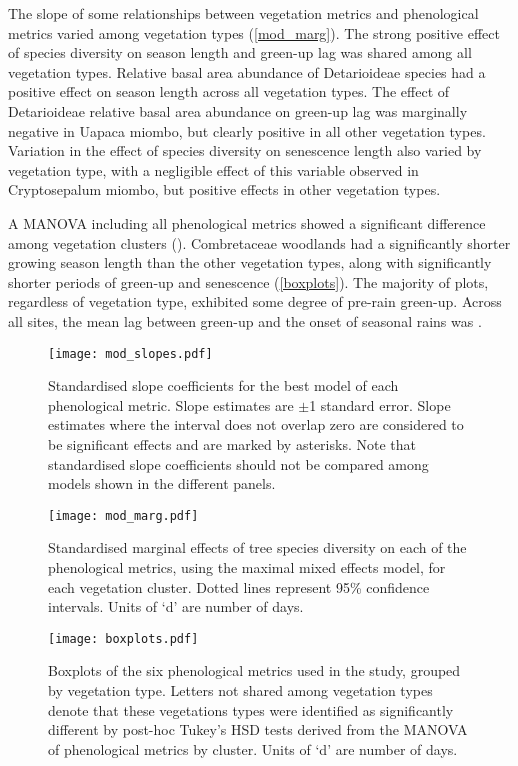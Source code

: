 \documentclass[11pt,a4paper]{article}
\begin{document}
The slope of some relationships between vegetation metrics and phenological metrics varied among vegetation types (\autoref{mod_marg}). The strong positive effect of species diversity on season length and green-up lag was shared among all vegetation types. Relative basal area abundance of Detarioideae species had a positive effect on season length across all vegetation types. The effect of Detarioideae relative basal area abundance on green-up lag was marginally negative in Uapaca miombo, but clearly positive in all other vegetation types. Variation in the effect of species diversity on senescence length also varied by vegetation type, with a negligible effect of this variable observed in Cryptosepalum miombo, but positive effects in other vegetation types.
 
A MANOVA including all phenological metrics showed a significant difference among vegetation clusters (\phenManova{}). Combretaceae woodlands had a significantly shorter growing season length than the other vegetation types, along with significantly shorter periods of green-up and senescence (\autoref{boxplots}). The majority of plots, regardless of vegetation type, exhibited some degree of pre-rain green-up. Across all sites, the mean lag between green-up and the onset of seasonal rains was \greenLagMean{}.

\begin{figure}[H]
\centering
	\texttt{[image: mod\_slopes.pdf]}
	\caption{Standardised slope coefficients for the best model of each phenological metric. Slope estimates are $\pm$1 standard error. Slope estimates where the interval does not overlap zero are considered to be significant effects and are marked by asterisks. Note that standardised slope coefficients should not be compared among models shown in the different panels.}
	\label{mod_slopes}
\end{figure}

\begin{figure}[H]
\centering
	\texttt{[image: mod\_marg.pdf]}
	\caption{Standardised marginal effects of tree species diversity on each of the phenological metrics, using the maximal mixed effects model, for each vegetation cluster. Dotted lines represent 95\% confidence intervals. Units of `d' are number of days.}
	\label{mod_marg}
\end{figure}

\begin{figure}[H]
\centering
	\texttt{[image: boxplots.pdf]}
	\caption{Boxplots of the six phenological metrics used in the study, grouped by vegetation type. Letters not shared among vegetation types denote that these vegetations types were identified as significantly different by post-hoc Tukey's HSD tests derived from the MANOVA of phenological metrics by cluster. Units of `d' are number of days.}
	\label{boxplots}
\end{figure}
\end{document}
